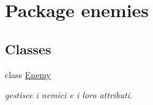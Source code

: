 \hypertarget{namespaceenemies}{}\section{Package enemies}
\label{namespaceenemies}
\subsection*{Classes}
\begin{DoxyCompactItemize}
\item 
class \hyperlink{classenemies_1_1_enemy}{Enemy}
\begin{DoxyCompactList}\small\item\em gestisce i nemici e i loro attributi. \end{DoxyCompactList}\end{DoxyCompactItemize}
